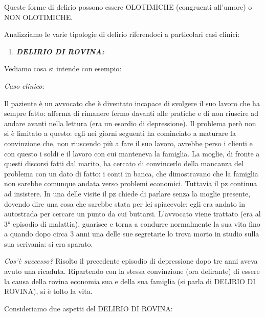 \documentclass[]{article}
\begin{document}
Queste forme di delirio possono essere OLOTIMICHE (congruenti all'umore)
o NON OLOTIMICHE.

Analizziamo le varie tipologie di delirio riferendoci a particolari casi
clinici:

\begin{enumerate}
\def\labelenumi{\arabic{enumi}.}
\item
  \textbf{\emph{DELIRIO DI ROVINA:}}
\end{enumerate}

Vediamo cosa si intende con esempio:

\emph{Caso clinico}:

Il paziente è un avvocato che è diventato incapace di svolgere il suo
lavoro che ha sempre fatto: afferma di rimanere fermo davanti alle
pratiche e di non riuscire ad andare avanti nella lettura (era un
esordio di depressione). Il problema però non si è limitato a questo:
egli nei giorni seguenti ha cominciato a maturare la convinzione che,
non riuscendo più a fare il suo lavoro, avrebbe perso i clienti e con
questo i soldi e il lavoro con cui manteneva la famiglia. La moglie, di
fronte a questi discorsi fatti dal marito, ha cercato di convincerlo
della mancanza del problema con un dato di fatto: i conti in banca, che
dimostravano che la famiglia non sarebbe comunque andata verso problemi
economici. Tuttavia il pz continua ad insistere. In una delle visite il
pz chiede di parlare senza la moglie presente, dovendo dire una cosa che
sarebbe stata per lei spiacevole: egli era andato in autostrada per
cercare un punto da cui buttarsi. L'avvocato viene trattato (era al 3°
episodio di malattia), guarisce e torna a condurre normalmente la sua
vita fino a quando dopo circa 3 anni una delle sue segretarie lo trova
morto in studio sulla sua scrivania: si era sparato.

\emph{Cos'è successo?} Risolto il precedente episodio di depressione
dopo tre anni aveva avuto una ricaduta. Ripartendo con la stessa
convinzione (ora delirante) di essere la causa della rovina economia sua
e della sua famiglia (si parla di DELIRIO DI ROVINA), si è tolto la
vita.

Consideriamo due aspetti del DELIRIO DI ROVINA:
\end{document}
